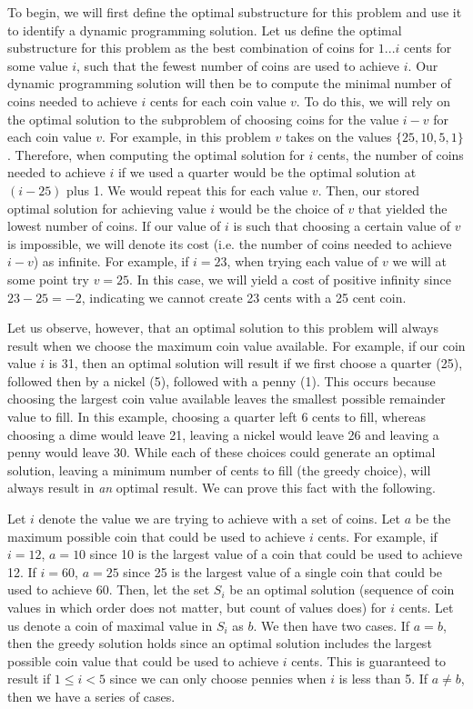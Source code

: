 \documentclass[11pt]{article}
\begin{document}
To begin, we will first define the optimal substructure for this problem and use it to identify a dynamic programming solution. Let us define the optimal substructure for this problem as the best combination of coins for $1...i$ cents for some value $i$, such that the fewest number of coins are used to achieve $i$. Our dynamic programming solution will then be to compute the minimal number of coins needed to achieve $i$ cents for each coin value $v$. To do this, we will rely on the optimal solution to the subproblem of choosing coins for the value $i-v$ for each coin value $v$. For example, in this problem $v$ takes on the values $\{25,10,5,1\}$. Therefore, when computing the optimal solution for $i$ cents, the number of coins needed to achieve $i$ if we used a quarter would be the optimal solution at $(i - 25)$ plus 1. We would repeat this for each value $v$. Then, our stored optimal solution for achieving value $i$ would be the choice of $v$ that yielded the lowest number of coins. If our value of $i$ is such that choosing a certain value of $v$ is impossible, we will denote its cost (i.e. the number of coins needed to achieve $i-v$) as infinite. For example, if $i = 23$, when trying each value of $v$ we will at some point try $v=25$. In this case, we will yield a cost of positive infinity since $23-25 = -2$, indicating we cannot create 23 cents with a 25 cent coin.

Let us observe, however, that an optimal solution to this problem will always result when we choose the maximum coin value available. For example, if our coin value $i$ is 31, then an optimal solution will result if we first choose a quarter (25), followed then by a nickel (5), followed with a penny (1). This occurs because choosing the largest coin value available leaves the smallest possible remainder value to fill. In this example, choosing a quarter left 6 cents to fill, whereas choosing a dime would leave 21, leaving a nickel would leave 26 and leaving a penny would leave 30. While each of these choices could generate an optimal solution, leaving a minimum number of cents to fill (the greedy choice), will always result in \textit{an} optimal result. We can prove this fact with the following.

Let $i$ denote the value we are trying to achieve with a set of coins. Let $a$ be the maximum possible coin that could be used to achieve $i$ cents. For example, if $i = 12$, $a=10$ since 10 is the largest value of a coin that could be used to achieve 12. If $i=60$, $a=25$ since 25 is the largest value of a single coin that could be used to achieve 60. Then, let the set $S_i$ be an optimal solution (sequence of coin values in which order does not matter, but count of values does) for $i$ cents. Let us denote a coin of maximal value in $S_i$ as $b$. We then have two cases. If $a=b$, then the greedy solution holds since an optimal solution includes the largest possible coin value that could be used to achieve $i$ cents. This is guaranteed to result if $1 \leq i < 5$ since we can only choose pennies when $i$ is less than 5. If $a \neq b$, then we have a series of cases.
\end{document}
